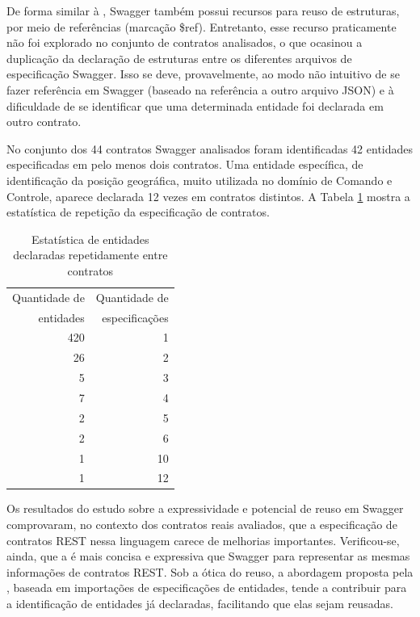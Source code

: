De forma similar à \neoidl{}, Swagger também possui recursos para reuso de
estruturas, por meio de referências (marcação \$ref). Entretanto, esse recurso
praticamente não foi explorado no conjunto de contratos analisados, o que
ocasinou a duplicação da declaração de estruturas entre os diferentes arquivos
de especificação Swagger. Isso se deve, provavelmente, ao modo não intuitivo de
se fazer referência em Swagger (baseado na referência a outro arquivo JSON) e à
dificuldade de se identificar que uma determinada entidade foi declarada em
outro contrato.

No conjunto dos 44 contratos Swagger analisados foram identificadas 42 entidades
especificadas em pelo menos dois contratos. Uma entidade específica, de
identificação da posição geográfica, muito utilizada no domínio de Comando e Controle, aparece
declarada 12 vezes em contratos distintos. A Tabela \ref{estatisticaEntidades}
mostra a estatística de repetição da especificação de contratos.
 
\begin{table}[!bth] 
\centering
\vspace{0.5cm}
\footnotesize
\begin{tabular}{r|r}
Quantidade de & Quantidade de \\
entidades &  especificações \\
\hline   
420 & 1 \\
26 & 2 \\
5 & 3 \\
7 & 4 \\
2 & 5 \\
2 & 6 \\
1 & 10 \\
1 & 12 \\

\end{tabular}
\caption{Estatística de entidades declaradas repetidamente entre contratos}
\label{estatisticaEntidades}
\end{table}

Os resultados do estudo sobre a expressividade e potencial de reuso em Swagger
comprovaram, no contexto dos contratos reais avaliados, que a especificação de
contratos REST nessa linguagem carece de melhorias importantes. Verificou-se,
ainda, que a \neoidl{} é mais concisa e expressiva que Swagger para representar
as mesmas informações de contratos REST. Sob a ótica do reuso, a abordagem proposta pela
\neoidl{}, baseada em importações de especificações de entidades, tende a
contribuir para a identificação de entidades já declaradas, facilitando que
elas sejam reusadas.

